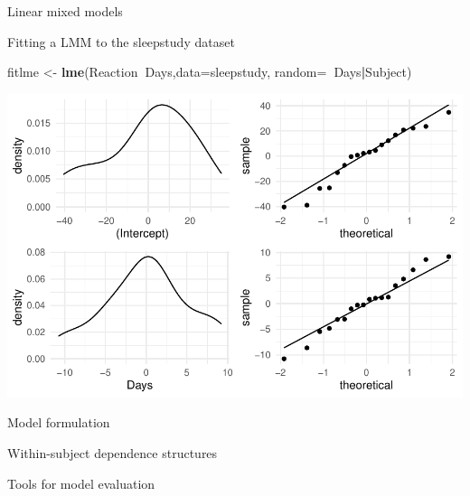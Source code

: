 \documentclass[
  ignorenonframetext,
]{beamer}
\newenvironment{Shaded}{\begin{snugshade}}{\end{snugshade}}
\newcommand{\DataTypeTok}[1]{\textcolor[rgb]{0.13,0.29,0.53}{#1}}
\newcommand{\KeywordTok}[1]{\textcolor[rgb]{0.13,0.29,0.53}{\textbf{#1}}}
\newcommand{\NormalTok}[1]{#1}
\newcommand{\OperatorTok}[1]{\textcolor[rgb]{0.81,0.36,0.00}{\textbf{#1}}}
\newcommand{\StringTok}[1]{\textcolor[rgb]{0.31,0.60,0.02}{#1}}
\begin{document}
\begin{frame}{Linear mixed models}
\protect\hypertarget{linear-mixed-models}{}

\end{frame}

\begin{frame}[fragile]{Fitting a LMM to the sleepstudy dataset}
\protect\hypertarget{fitting-a-lmm-to-the-sleepstudy-dataset}{}

\begin{Shaded}
\begin{Highlighting}[]
\NormalTok{fitlme <-}\StringTok{ }\KeywordTok{lme}\NormalTok{(Reaction}\OperatorTok{~}\NormalTok{Days,}\DataTypeTok{data=}\NormalTok{sleepstudy,}
            \DataTypeTok{random=}\OperatorTok{~}\NormalTok{Days}\OperatorTok{|}\NormalTok{Subject)}
\end{Highlighting}
\end{Shaded}

\begin{center}\includegraphics[width=0.7\linewidth]{codes_files/figure-beamer/fit1plot-1} \end{center}

\end{frame}

\begin{frame}{Model formulation}
\protect\hypertarget{model-formulation}{}

\end{frame}

\begin{frame}{Within-subject dependence structures}
\protect\hypertarget{within-subject-dependence-structures}{}

\end{frame}

\begin{frame}{Tools for model evaluation}
\protect\hypertarget{tools-for-model-evaluation}{}

\end{frame}
\end{document}

